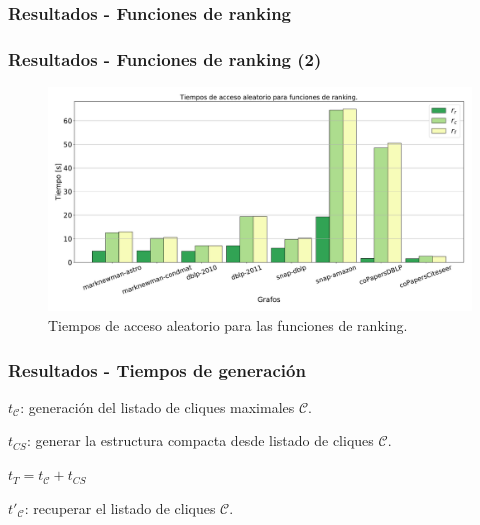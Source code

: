 \begin{frame}
\frametitle{Resultados - Funciones de ranking}



\end{frame}


\begin{frame}
\frametitle{Resultados - Funciones de ranking (2)}

\begin{figure}
    	\centering
    \includegraphics[width=1\linewidth]{../img/timesRanking.pdf}
    	
    \caption{Tiempos de acceso aleatorio para las funciones de ranking.}
\end{figure}

\end{frame}


\begin{frame}
\frametitle{Resultados - Tiempos de generación}

{\footnotesize

}

$t_{\mathcal{C}}$: generación del listado de cliques maximales $\mathcal{C}$.

$t_{CS}$: generar la estructura compacta desde listado de cliques $\mathcal{C}$.

$t_{T} = t_{\mathcal{C}} + t_{CS}$

$t'_{\mathcal{C}}$: recuperar el listado de cliques $\mathcal{C}$.

\end{frame}

